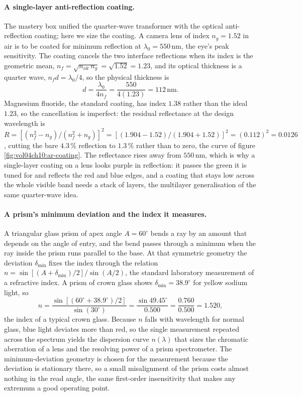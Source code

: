 \paragraph{A single-layer anti-reflection coating.}
The mastery box unified the quarter-wave transformer with the optical
anti-reflection coating; here we size the coating. A camera lens of index
$n_g = 1.52$ in air is to be coated for minimum reflection at
$\lambda_0 = 550\,\si{\nano\meter}$, the eye's peak sensitivity. The
coating cancels the two interface reflections when its index is the
geometric mean, $n_f = \sqrt{n_{\text{air}}\,n_g} = \sqrt{1.52} = 1.23$,
and its optical thickness is a quarter wave, $n_f d = \lambda_0/4$, so the
physical thickness is
\[
d = \frac{\lambda_0}{4 n_f} = \frac{550}{4(1.23)} = 112\,\si{\nano\meter}.
\]
Magnesium fluoride, the standard coating, has index $1.38$ rather than the
ideal $1.23$, so the cancellation is imperfect: the residual reflectance at
the design wavelength is $R = [(n_f^2 - n_g)/(n_f^2 + n_g)]^2 = [(1.904 -
1.52)/(1.904 + 1.52)]^2 = (0.112)^2 = 0.0126$, cutting the bare $4.3\,\%$
reflection to $1.3\,\%$ rather than to zero, the curve of figure
\ref{fig:vol04ch10:ar-coating}. The reflectance rises away from $550\,\si{
\nano\meter}$, which is why a single-layer coating on a lens looks purple
in reflection: it passes the green it is tuned for and reflects the red and
blue edges, and a coating that stays low across the whole visible band
needs a stack of layers, the multilayer generalisation of the same
quarter-wave idea.



\paragraph{A prism's minimum deviation and the index it measures.}
A triangular glass prism of apex angle $A = 60^{\circ}$ bends a ray by an
amount that depends on the angle of entry, and the bend passes through a
minimum when the ray inside the prism runs parallel to the base. At that
symmetric geometry the deviation $\delta_{\min}$ fixes the index through
the relation $n = \sin[(A+\delta_{\min})/2]/\sin(A/2)$, the standard
laboratory measurement of a refractive index. A prism of crown glass shows
$\delta_{\min} = 38.9^{\circ}$ for yellow sodium light, so
\[
n = \frac{\sin[(60^{\circ}+38.9^{\circ})/2]}{\sin(30^{\circ})} =
\frac{\sin 49.45^{\circ}}{0.500} = \frac{0.760}{0.500} = 1.520,
\]
the index of a typical crown glass. Because $n$ falls with wavelength for
normal glass, blue light deviates more than red, so the single measurement
repeated across the spectrum yields the dispersion curve $n(\lambda)$ that
sizes the chromatic aberration of a lens and the resolving power of a
prism spectrometer. The minimum-deviation geometry is chosen for the
measurement because the deviation is stationary there, so a small
misalignment of the prism costs almost nothing in the read angle, the
same first-order insensitivity that makes any extremum a good operating
point.

